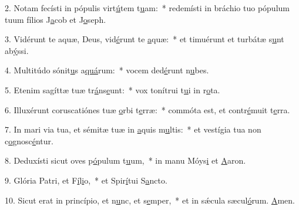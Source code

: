 2. Notam fecísti in pópulis virt\uline{ú}tem t\uline{u}am:~* redemísti in bráchio tuo pópulum tuum fílios J\uline{a}cob et J\uline{o}seph.\par 
3. Vidérunt te aquæ, Deus, vid\uline{é}runt te \uline{a}quæ:~* et timuérunt et turbátæ s\uline{u}nt ab\uline{ý}ssi.\par 
4. Multitúdo sónit\uline{u}s a\uline{quá}rum:~* vocem ded\uline{é}runt n\uline{u}bes.\par 
5. Etenim sagíttæ tuæ tr\uline{á}ns\uline{e}unt:~* vox tonítrui t\uline{u}i in r\uline{o}ta.\par 
6. Illuxérunt coruscatiónes tuæ \uline{o}rbi t\uline{e}rræ:~* commóta est, et contr\uline{é}muit t\uline{e}rra.\par 
7. In mari via tua, et sémitæ tuæ in \uline{a}quis m\uline{u}ltis:~* et vestígia tua non c\uline{o}gnosc\uline{é}ntur.\par 
8. Deduxísti sicut oves p\uline{ó}pulum t\uline{u}um,~* in manu Móys\uline{i} et \uline{A}aron.\par 
9. Glória Patri, et F\uline{í}l\uline{i}o,~* et Spir\uline{í}tui S\uline{a}ncto.\par 
10. Sicut erat in princípio, et n\uline{u}nc, et s\uline{e}mper,~* et in sǽcula sæcul\uline{ó}rum. \uline{A}men.\par 

